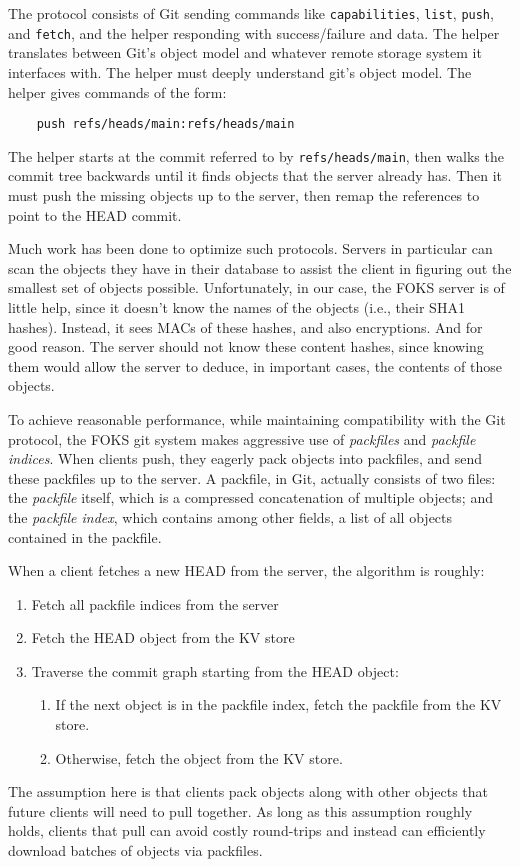 The protocol consists of Git sending commands like \texttt{capabilities},
\texttt{list}, \texttt{push}, and \texttt{fetch}, and the helper responding
with success/failure and data. The helper translates between
Git's object model and whatever remote storage system it interfaces with.
The helper must deeply understand git's object model. The 
helper gives commands of the form:
%
\begin{verbatim}
    push refs/heads/main:refs/heads/main
\end{verbatim}
%
The helper starts at the commit referred to by \texttt{refs/heads/main},
then walks the commit tree backwards until it finds objects that the
server already has. Then it must push the missing objects up to the server,
then remap the references to point to the HEAD commit.

Much work has been done to optimize such protocols. Servers in particular
can scan the objects they have in their database to assist the client
in figuring out the smallest set of objects possible. Unfortunately,
in our case, the FOKS server is of little help, since it doesn't
know the names of the objects (i.e., their SHA1 hashes). Instead, it
sees MACs of these hashes, and also encryptions. And for good reason.
The server should not know these content hashes, since knowing them
would allow the server to deduce, in important cases, the contents
of those objects. 

To achieve reasonable performance, while maintaining compatibility
with the Git protocol, the FOKS git system makes aggressive use
of \textit{packfiles} and \textit{packfile indices}. When
clients push, they eagerly pack objects into packfiles, 
and send these packfiles up to the server. A packfile, in Git, 
actually consists of two files: the \textit{packfile} itself,
which is a compressed concatenation of multiple objects; and
the \textit{packfile index}, which contains among other fields,
a list of all objects contained in the packfile. 

When a client fetches a new HEAD from the server, the algorithm is roughly:
%
\begin{enumerate}[itemsep=2pt,parsep=0pt]
    \item Fetch all packfile indices from the server
    \item Fetch the HEAD object from the KV store
    \item Traverse the commit graph starting from the HEAD object:
    \begin{enumerate}[itemsep=2pt,parsep=0pt]
        \item If the next object is in the packfile index, fetch
             the packfile from the KV store.
        \item Otherwise, fetch the object from the KV store.
    \end{enumerate}
\end{enumerate}
%
The assumption here is that clients pack objects along with other
objects that future clients will need to pull together. As long
as this assumption roughly holds, clients that pull can avoid
costly round-trips and instead can efficiently download batches of objects
via packfiles.

